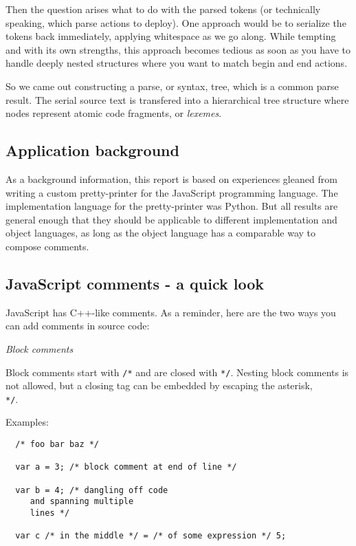 \documentclass[11pt,a4paper]{article}
\begin{document}
Then the question arises what to do with the parsed tokens (or technically
speaking, which parse actions to deploy). One approach would be to serialize the
tokens back immediately, applying whitespace as we go along. While tempting and
with its own strengths, this approach becomes tedious as soon as you have to handle
deeply nested structures where you want to match begin and end actions.

So we came out constructing a parse, or syntax, tree, which is a common parse
result. The serial source text is transfered into a hierarchical tree structure
where nodes represent atomic code fragments, or \emph{lexemes}.

\subsection{Application background}

As a background information, this report is based on experiences gleaned from
writing a custom pretty-printer for the JavaScript programming language. The
implementation language for the pretty-printer was Python. But all results are
general enough that they should be applicable to different implementation and
object languages, as long as the object language has a comparable way to compose
comments.

\subsection{JavaScript comments - a quick look}

JavaScript has C++-like comments. As a reminder, here are the two ways you
can add comments in source code:

\textit{Block comments}

Block comments start with \texttt{/*} and are closed with \texttt{*/}. Nesting
block comments is not allowed, but a closing tag can be embedded by escaping the
asterisk, \texttt{\\*/}.

Examples:

\begin{verbatim}
  /* foo bar baz */

  var a = 3; /* block comment at end of line */

  var b = 4; /* dangling off code
     and spanning multiple
     lines */

  var c /* in the middle */ = /* of some expression */ 5;

\end{verbatim}
\end{document}
